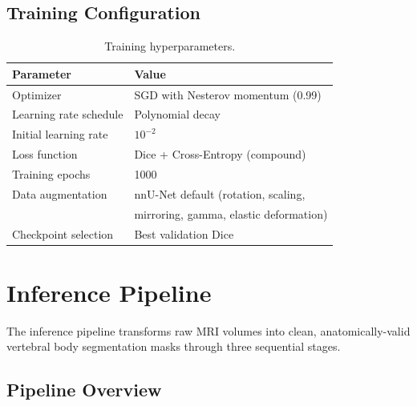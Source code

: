 \documentclass[12pt, a4paper]{article}
\begin{document}
\subsection{Training Configuration}

\begin{table}[H]
\centering
\caption{Training hyperparameters.}
\begin{tabular}{@{}ll@{}}
\toprule
\textbf{Parameter} & \textbf{Value} \\
\midrule
Optimizer & SGD with Nesterov momentum (0.99) \\
Learning rate schedule & Polynomial decay \\
Initial learning rate & $10^{-2}$ \\
Loss function & Dice + Cross-Entropy (compound) \\
Training epochs & 1000 \\
Data augmentation & nnU-Net default (rotation, scaling, \\
 & mirroring, gamma, elastic deformation) \\
Checkpoint selection & Best validation Dice \\
\bottomrule
\end{tabular}
\end{table}

\section{Inference Pipeline}
\label{sec:inference}

The inference pipeline transforms raw MRI volumes into clean, anatomically-valid vertebral body segmentation masks through three sequential stages.

\subsection{Pipeline Overview}
\end{document}
